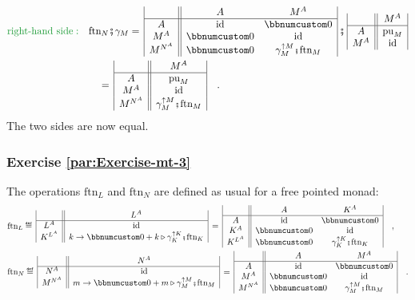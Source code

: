 \begin{align*}
{\color{greenunder}\text{right-hand side}:}\quad & \text{ftn}_{N}\bef\gamma_{M}=\,\begin{array}{|c||cc|}
 & A & M^{A}\\
\hline A & \text{id} & \bbnum 0\\
M^{A} & \bbnum 0 & \text{id}\\
M^{N^{A}} & \bbnum 0 & \gamma_{M}^{\uparrow M}\bef\text{ftn}_{M}
\end{array}\,\bef\,\begin{array}{|c||c|}
 & M^{A}\\
\hline A & \text{pu}_{M}\\
M^{A} & \text{id}
\end{array}\\
 & \quad=\,\begin{array}{|c||c|}
 & M^{A}\\
\hline A & \text{pu}_{M}\\
M^{A} & \text{id}\\
M^{N^{A}} & \gamma_{M}^{\uparrow M}\bef\text{ftn}_{M}
\end{array}\quad.
\end{align*}
The two sides are now equal.

\subsubsection*{Exercise \ref{par:Exercise-mt-3}}

The operations $\text{ftn}_{L}$ and $\text{ftn}_{N}$ are defined
as usual for a free pointed monad:
\begin{align*}
 & \text{ftn}_{L}\triangleq\,\begin{array}{|c||c|}
 & L^{A}\\
\hline L^{A} & \text{id}\\
K^{L^{A}} & k\rightarrow\bbnum 0+k\triangleright\gamma_{K}^{\uparrow K}\bef\text{ftn}_{K}
\end{array}\,=\,\begin{array}{|c||cc|}
 & A & K^{A}\\
\hline A & \text{id} & \bbnum 0\\
K^{A} & \bbnum 0 & \text{id}\\
K^{L^{A}} & \bbnum 0 & \gamma_{K}^{\uparrow K}\bef\text{ftn}_{K}
\end{array}\quad,\\
 & \text{ftn}_{N}\triangleq\,\begin{array}{|c||c|}
 & N^{A}\\
\hline N^{A} & \text{id}\\
M^{N^{A}} & m\rightarrow\bbnum 0+m\triangleright\gamma_{M}^{\uparrow M}\bef\text{ftn}_{M}
\end{array}\,=\,\begin{array}{|c||cc|}
 & A & M^{A}\\
\hline A & \text{id} & \bbnum 0\\
M^{A} & \bbnum 0 & \text{id}\\
M^{N^{A}} & \bbnum 0 & \gamma_{M}^{\uparrow M}\bef\text{ftn}_{M}
\end{array}\quad.
\end{align*}

